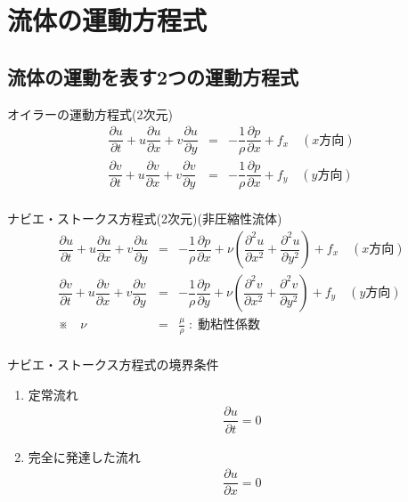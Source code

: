 \documentclass[a4paper]{jsarticle}
\begin{document}
\section{流体の運動方程式}
\subsection{流体の運動を表す2つの運動方程式}
\begin{itembox}[l]{オイラーの運動方程式(2次元)}
    \begin{eqnarray*}
        \dfrac{\partial u}{\partial t}+u\dfrac{\partial u}{\partial x}+v\dfrac{\partial u}{\partial y}&=&-\dfrac{1}{\rho}\dfrac{\partial p}{\partial x}+f_x\quad(x方向)\\
        \dfrac{\partial v}{\partial t}+u\dfrac{\partial v}{\partial x}+v\dfrac{\partial v}{\partial y}&=&-\dfrac{1}{\rho}\dfrac{\partial p}{\partial x}+f_y\quad(y方向)\\
    \end{eqnarray*}
\end{itembox}
\begin{itembox}[l]{ナビエ・ストークス方程式(2次元)\quad(非圧縮性流体)}
    \begin{eqnarray*}
        \dfrac{\partial u}{\partial t}+u\dfrac{\partial u}{\partial x}+v\dfrac{\partial u}{\partial y}&=&-\dfrac{1}{\rho}\dfrac{\partial p}{\partial x}+\nu\left(\dfrac{\partial^2 u}{\partial x^2}+\dfrac{\partial^2 u}{\partial y^2}\right)+f_x\quad(x方向)\\
        \dfrac{\partial v}{\partial t}+u\dfrac{\partial v}{\partial x}+v\dfrac{\partial v}{\partial y}&=&-\dfrac{1}{\rho}\dfrac{\partial p}{\partial y}+\nu\left(\dfrac{\partial^2 v}{\partial x^2}+\dfrac{\partial^2 v}{\partial y^2}\right)+f_y\quad(y方向)\\
        ※\quad \nu &=& \frac{\mu}{\rho} \;:\; 動粘性係数\\
    \end{eqnarray*}
\end{itembox}
\begin{itembox}[l]{ナビエ・ストークス方程式の境界条件}
    \begin{enumerate}
        \item 定常流れ
              \begin{eqnarray*}
                  \dfrac{\partial u}{\partial t}=0
              \end{eqnarray*}
        \item 完全に発達した流れ
              \begin{eqnarray*}
                  \dfrac{\partial u}{\partial x}=0
              \end{eqnarray*}
    \end{enumerate}
\end{itembox}
\end{document}
